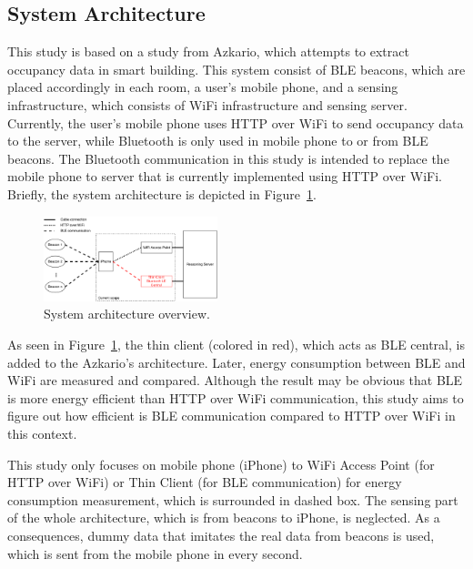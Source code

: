 \documentclass[journal]{vgtc}                %
\begin{document}
\subsection{System Architecture} %
\label{sub:system_architecture}
This study is based on a study from Azkario, which attempts to extract occupancy data in smart building. This system consist of BLE beacons, which are placed accordingly in each room, a user's mobile phone, and a sensing infrastructure, which consists of WiFi infrastructure and sensing server. Currently, the user's mobile phone uses HTTP over WiFi to send occupancy data to the server, while Bluetooth is only used in mobile phone to or from BLE beacons. The Bluetooth communication in this study is intended to replace the mobile phone to server that is currently implemented using HTTP over WiFi. Briefly, the system architecture is depicted in Figure~\ref{fig:system-architecture}. 

\begin{figure}
  \centering
    \includegraphics[width=0.45\textwidth]{system-architecture}
  \caption{System architecture overview.}
  \label{fig:system-architecture}
\end{figure}

As seen in Figure~\ref{fig:system-architecture}, the thin client (colored in red), which acts as BLE central, is added to the Azkario's architecture. Later, energy consumption between BLE and WiFi are measured and compared. Although the result may be obvious that BLE is more energy efficient than HTTP over WiFi communication, this study aims to figure out how efficient is BLE communication compared to HTTP over WiFi in this context.

This study only focuses on mobile phone (iPhone) to WiFi Access Point (for HTTP over WiFi) or Thin Client (for BLE communication) for energy consumption measurement, which is surrounded in dashed box. The sensing part of the whole architecture, which is from beacons to iPhone, is neglected. As a consequences, dummy data that imitates the real data from beacons is used, which is sent from the mobile phone in every second.
\end{document}
